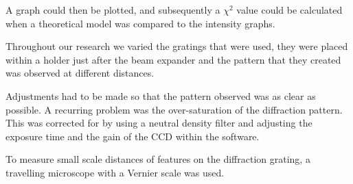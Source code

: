 \documentclass[twocolumn]{revtex4}
\begin{document}
A graph could then be plotted, and subsequently a $\chi^2$ value could be calculated when a theoretical model was compared to the intensity graphs.

Throughout our research we varied the gratings that were used, they were placed within a holder just after the beam expander and the pattern that they created was observed at different distances. 

Adjustments had to be made so that the pattern observed was as clear as possible. A recurring problem was the over-saturation of the diffraction pattern. This was corrected for by using a neutral density filter and adjusting the exposure time and the gain of the CCD within the software.

To measure small scale distances of features on the diffraction grating, a travelling microscope with a Vernier scale was used.

\vspace{-3ex}
\end{document}
